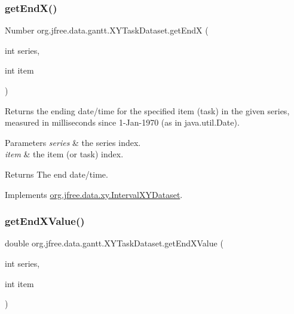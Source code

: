 \subsubsection{\texorpdfstring{get\+End\+X()}{getEndX()}}
{\footnotesize\ttfamily Number org.\+jfree.\+data.\+gantt.\+X\+Y\+Task\+Dataset.\+get\+EndX (\begin{DoxyParamCaption}\item[{int}]{series,  }\item[{int}]{item }\end{DoxyParamCaption})}

Returns the ending date/time for the specified item (task) in the given series, measured in milliseconds since 1-\/\+Jan-\/1970 (as in java.\+util.\+Date).


\begin{DoxyParams}{Parameters}
{\em series} & the series index. \\
\hline
{\em item} & the item (or task) index.\\
\hline
\end{DoxyParams}
\begin{DoxyReturn}{Returns}
The end date/time. 
\end{DoxyReturn}


Implements \mbox{\hyperlink{interfaceorg_1_1jfree_1_1data_1_1xy_1_1_interval_x_y_dataset_a93161a6d6c1db37cfac030239c62ab0a}{org.\+jfree.\+data.\+xy.\+Interval\+X\+Y\+Dataset}}.

\mbox{\label{classorg_1_1jfree_1_1data_1_1gantt_1_1_x_y_task_dataset_a547af5fef423693d0b96a4a89060f8b8}} 
\subsubsection{\texorpdfstring{get\+End\+X\+Value()}{getEndXValue()}}
{\footnotesize\ttfamily double org.\+jfree.\+data.\+gantt.\+X\+Y\+Task\+Dataset.\+get\+End\+X\+Value (\begin{DoxyParamCaption}\item[{int}]{series,  }\item[{int}]{item }\end{DoxyParamCaption})}

